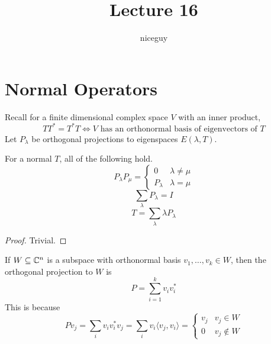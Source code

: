 \documentclass[12pt]{article}
\author{niceguy}
\title{Lecture 16}
\begin{document}
\maketitle

\section{Normal Operators}

Recall for a finite dimensional complex space $V$ with an inner product,
$$TT^* = T^*T \Leftrightarrow V \text{ has an orthonormal basis of eigenvectors of } T$$
Let $P_\lambda$ be orthogonal projections to eigenspaces $E(\lambda,T)$.

\begin{thm}
	For a normal $T$, all of the following hold.
	$$P_\lambda P_\mu = \begin{cases} 0 & \lambda \neq \mu \\ P_\lambda & \lambda = \mu \end{cases}$$
	$$\sum_\lambda P_\lambda = I$$
	$$T = \sum_\lambda \lambda P_\lambda$$
\end{thm}

\begin{proof}
	Trivial.
\end{proof}

If $W \subseteq \mathbb{C}^n$ is a subspace with orthonormal basis $v_1,\dots,v_k \in W$, then the orthogonal projection to $W$ is
$$P = \sum_{i=1}^k v_iv_i^*$$
This is because
$$Pv_j = \sum_iv_iv_i^*v_j = \sum_iv_i\langle v_j,v_i \rangle = \begin{cases} v_j & v_j \in W \\ 0 & v_j \notin W\end{cases}$$
\end{document}
